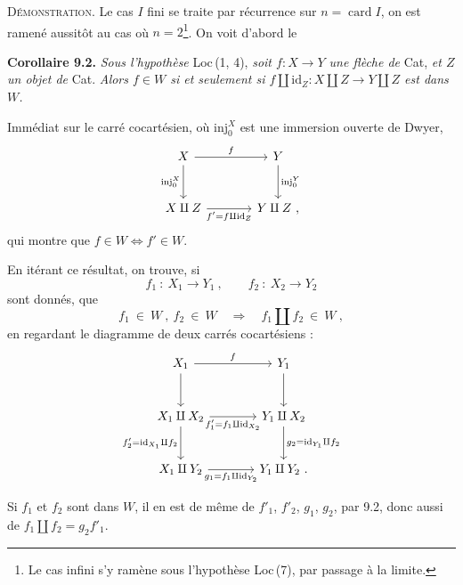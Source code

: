 \documentclass[11pt]{article}
\newcommand{\printedpage}[1]{\marginpar{\footnotesize p.~#1}}
\newcommand{\msp}[1]{\marginpar{\footnotesize [#1]}}
\newcommand{\id}{\mathrm{id}}
\newcommand{\inj}{\mathrm{inj}}
\begin{document}
\textsc{Démonstration}. Le cas $I$ fini se traite par récurrence sur $n=\operatorname{card}I$, on est ramené aussitôt au cas où $n=2$\footnote[46]{Le cas infini s'y ramène sous l'hypothèse Loc\,(7), par passage à la limite.}. On voit d'abord le

\msp{page 120}

\textbf{Corollaire 9.2.} \textit{Sous l'hypothèse} Loc\,(1, 4), \textit{soit $f : X\longrightarrow Y$ une flèche de} Cat, \textit{et $Z$ un objet de} Cat. \textit{Alors $f\in W$ si et seulement si $f\amalg\id_Z : X\amalg Z\longrightarrow Y\amalg Z$ est dans $W$.}

Immédiat sur le carré cocartésien, où $\inj_0^X$ est une immersion ouverte de Dwyer,
\[
\begin{tikzcd}[column sep=large, row sep=large]
X \arrow[r, "f"] \arrow[d, "\inj_0^X"'] & Y \arrow[d, "\inj_0^Y"] \\
X\amalg Z \arrow[r, "f'=f\amalg\id_Z"'] & Y\amalg Z\ ,
\end{tikzcd}
\]
qui montre que $f\in W\iff f'\in W$.

En itérant ce résultat, on trouve, si
\[
f_1\ :\ X_1\longrightarrow Y_1\ ,\qquad f_2\ :\ X_2\longrightarrow Y_2
\]
sont donnés, que
\[
f_1\ \in\ W\ ,\ f_2\ \in\ W\quad\Longrightarrow\quad f_1\amalg f_2\ \in\ W\ ,
\]
en regardant le diagramme de deux carrés cocartésiens :
\[
\begin{tikzcd}[column sep=large, row sep=large]
X_1 \arrow[r, "f"] \arrow[d] & Y_1 \arrow[d] \\ %
X_1\amalg X_2 \arrow[r, "f'_1=f_1\amalg\id_{X_2}"'] \arrow[d, "f'_2=\id_{X_1}\amalg f_2"'] & Y_1\amalg X_2 \arrow[d, "g_2=\id_{Y_1}\amalg f_2"] \\
X_1\amalg Y_2 \arrow[r, "g_1=f_1\amalg\id_{Y_2}"'] & Y_1\amalg Y_2\ .
\end{tikzcd}
\]

\printedpage{66}

Si $f_1$ et $f_2$ sont dans $W$, il en est de même de $f'_1$, $f'_2$, $g_1$, $g_2$, par 9.2, donc aussi de $f_1\amalg f_2=g_2f'_1$.

\msp{page 121}
\end{document}
